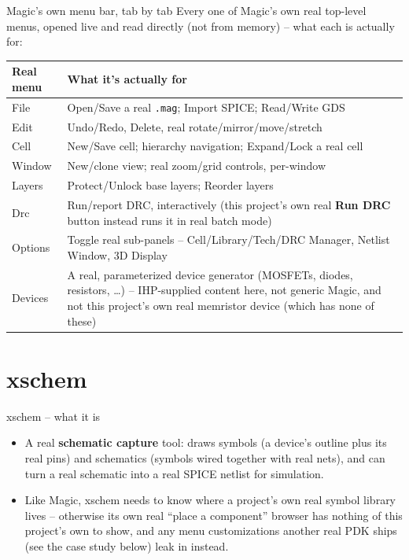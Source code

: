 \documentclass[aspectratio=169]{beamer}
\begin{document}
\begin{frame}[fragile]{Magic's own menu bar, tab by tab}
Every one of Magic's own real top-level menus, opened live and read
directly (not from memory) -- what each is actually for:
\footnotesize
\begin{center}
\begin{tabularx}{\textwidth}{@{}p{}X@{}}
\toprule
Real menu & What it's actually for \\
\midrule
File & Open/Save a real \texttt{.mag}; Import SPICE; Read/Write GDS \\
Edit & Undo/Redo, Delete, real rotate/mirror/move/stretch \\
Cell & New/Save cell; hierarchy navigation; Expand/Lock a real cell \\
Window & New/clone view; real zoom/grid controls, per-window \\
Layers & Protect/Unlock base layers; Reorder layers \\
Drc & Run/report DRC, interactively (this project's own real
      \textbf{Run DRC} button instead runs it in real batch mode) \\
Options & Toggle real sub-panels -- Cell/Library/Tech/DRC Manager,
          Netlist Window, 3D Display \\
Devices & A real, parameterized device generator (MOSFETs, diodes,
           resistors, \dots) -- IHP-supplied content here, not
           generic Magic, and not this project's own real memristor
           device (which has none of these) \\
\bottomrule
\end{tabularx}
\end{center}
\normalsize
\end{frame}

\section{xschem}
\begin{frame}{xschem -- what it is}
\begin{itemize}
  \item A real \textbf{schematic capture} tool: draws symbols (a
        device's outline plus its real pins) and schematics (symbols
        wired together with real nets), and can turn a real schematic
        into a real SPICE netlist for simulation.
  \item Like Magic, xschem needs to know where a project's own real
        symbol library lives -- otherwise its own real ``place a
        component'' browser has nothing of this project's own to
        show, and any menu customizations another real PDK ships
        (see the case study below) leak in instead.
\end{itemize}
\end{frame}
\end{document}
